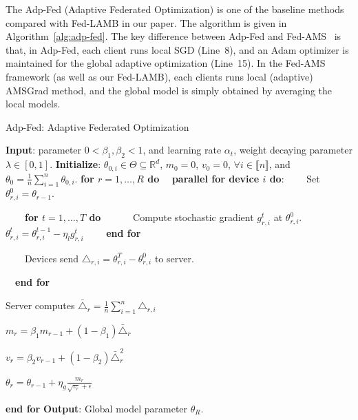 \documentclass[nohyperref]{article}
\theoremstyle{plain}
\theoremstyle{definition}
\theoremstyle{remark}
\begin{document}
The Adp-Fed (Adaptive Federated Optimization) is one of the baseline methods compared with Fed-LAMB in our paper. The algorithm is given in Algorithm~\ref{alg:adp-fed}. The key difference between Adp-Fed and Fed-AMS~\citep{chen2020toward} is that, in Adp-Fed, each client runs local SGD (Line~8), and an Adam optimizer is maintained for the global adaptive optimization (Line~15). In the Fed-AMS framework (as well as our Fed-LAMB), each clients runs local (adaptive) AMSGrad method, and the global model is simply obtained by averaging the local models.


\begin{algorithm}[H]
\caption{Adp-Fed: Adaptive Federated Optimization~\citep{reddi2020adaptive}} \label{alg:adp-fed}
\begin{algorithmic}[1]
\STATE \textbf{Input}: parameter $0< \beta_1, \beta_2 <1$, and learning rate $\alpha_t$, weight decaying parameter $\lambda \in [0,1]$.
\STATE \textbf{Initialize}: $\theta_{0,i} \in \Theta \subseteq \mathbb R^d $, $m_0=0$, $v_{0} =0$, $\forall i\in \llbracket n\rrbracket$, and $\theta_0 =  \frac{1}{n} \sum_{i=1}^n \theta_{0,i}$.
\vspace{0.05in}
\STATE \textbf{for $r=1, \ldots, R$ do}
\STATE $\quad$\textbf{parallel for device $i$ do}:
\STATE $\qquad$Set $\theta_{r,i}^{0} = \theta_{r-1}$.

\STATE $\qquad$\textbf{for $t=1, \ldots, T$ do}
\STATE $\qquad\quad$Compute stochastic gradient $g^t_{r,i}$ at $\theta_{r,i}^{0}$.
\STATE $\qquad\quad$$\theta_{r,i}^t=\theta_{r,i}^{t-1}-\eta_l g_{r,i}^t$ \label{adpfed line:local SGD} 
\STATE $\qquad$\textbf{end for}


\STATE $\qquad$Devices send $\triangle_{r,i}=\theta_{r,i}^T-\theta_{r,i}^0$ to server.

\STATE $\quad$\textbf{end for}

\STATE \quad Server computes $\bar{\triangle}_r = \frac{1}{n}\sum_{i=1}^n \triangle_{r,i}$

\STATE \quad $m_r = \beta_1 m_{r-1} + (1-\beta_1)\bar{\triangle}_r$

\STATE \quad $v_r = \beta_2 v_{r-1} + (1-\beta_2)\bar{\triangle}_r^2$

\STATE \quad $\theta_r = \theta_{r-1}+\eta_g\frac{m_r}{\sqrt{v_r}+\epsilon}$ \label{adpfed line:global adam}

\STATE \textbf{end for}
\STATE \textbf{Output}: Global model parameter $\theta_R$.
\end{algorithmic}
\end{algorithm}
\end{document}

